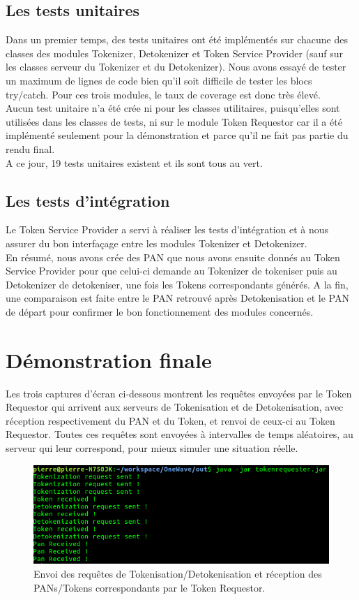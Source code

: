 \documentclass{report}
\begin{document}
\subsection{Les tests unitaires}
Dans un premier temps, des tests unitaires ont été implémentés sur chacune des classes des modules Tokenizer, Detokenizer et Token Service Provider (sauf sur les classes serveur du Tokenizer et du Detokenizer). Nous avons essayé de tester un maximum de lignes de code bien qu'il soit difficile de tester les blocs try/catch. Pour ces trois modules, le taux de coverage est donc très élevé.\\
Aucun test unitaire n'a été crée ni pour les classes utilitaires, puisqu'elles sont utilisées dans les classes de tests, ni sur le module Token Requestor car il a été implémenté seulement pour la démonstration et parce qu'il ne fait pas partie du rendu final.\\
A ce jour, 19 tests unitaires existent et ils sont tous au vert.

\subsection{Les tests d'intégration}
Le Token Service Provider a servi à réaliser les tests d'intégration et à nous assurer du bon interfaçage entre les modules Tokenizer et Detokenizer.\\
En résumé, nous avons crée des PAN que nous avons ensuite donnés au Token Service Provider pour que celui-ci demande au Tokenizer de tokeniser puis au Detokenizer de detokeniser, une fois les Tokens correspondants générés. A la fin, une comparaison est faite entre le PAN retrouvé après Detokenisation et le PAN de départ pour confirmer le bon fonctionnement des modules concernés. 

\newpage
\section{Démonstration finale}
Les trois captures d'écran ci-dessous montrent les requêtes envoyées par le Token Requestor qui arrivent aux serveurs de Tokenisation et de Detokenisation, avec réception respectivement du PAN et du Token, et renvoi de ceux-ci au Token Requestor. Toutes ces requêtes sont envoyées à intervalles de temps aléatoires, au serveur qui leur correspond, pour mieux simuler une situation réelle. 

\begin{figure}[!ht]
    \centering
			\includegraphics[scale=0.47]{img/client_tokenRequestor.png}
			\caption{\label{Trello} Envoi des requêtes de Tokenisation/Detokenisation et réception des PANs/Tokens correspondants par le Token Requestor.}			
\end{figure}
\end{document}
